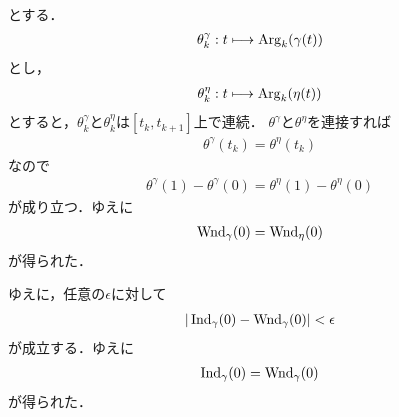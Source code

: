 \begin{sketch}
\begin{description}
\begin{align}
				\end{align}
				とする．
				\begin{align}
					\theta^{\gamma}_k: t \longmapsto \operatorname{Arg}_k(\gamma(t))
				\end{align}
				とし，
				\begin{align}
					\theta^{\eta}_k: t \longmapsto \operatorname{Arg}_k(\eta(t))
				\end{align}
				とすると，$\theta^{\gamma}_k$と$\theta^{\eta}_k$は$\left[t_k,t_{k+1}\right]$上で連続．
				$\theta^{\gamma}$と$\theta^{\eta}$を連接すれば
				\begin{align}
					\theta^{\gamma}(t_k) = \theta^{\eta}(t_k)
				\end{align}
				なので
				\begin{align}
					\theta^{\gamma}(1) - \theta^{\gamma}(0) = \theta^{\eta}(1) - \theta^{\eta}(0)
				\end{align}
				が成り立つ．ゆえに
				\begin{align}
					\operatorname{Wnd}_{\gamma}(0) = \operatorname{Wnd}_{\eta}(0)
				\end{align}
				が得られた．
				\QED
		\end{description}
	\end{sketch}
	
	ゆえに，任意の$\epsilon$に対して
	\begin{align}
		|\operatorname{Ind}_{\gamma}(0) - \operatorname{Wnd}_{\gamma}(0)| < \epsilon
	\end{align}
	が成立する．ゆえに
	\begin{align}
		\operatorname{Ind}_{\gamma}(0) = \operatorname{Wnd}_{\gamma}(0)
	\end{align}
	が得られた．